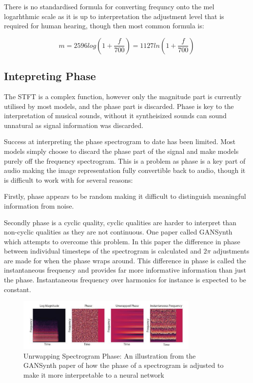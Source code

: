 There is no standardised formula for converting frequncy onto the mel logarhthmic scale as it is up to interpretation the adjustment level that is required for human hearing, though then most common formula is\cite{SpeechCommunication}:

\begin{equation}
    m = 2596 log(1 +  \frac{f}{700}) = 1127 ln (1 + \frac{f}{700})
\end{equation}

\subsection{Intepreting Phase}

The STFT is a complex function, however only the magnitude part is currently utilised by most models, and the phase part is discarded. Phase is key to the interpretation of musical sounds, without it syntheisized sounds can sound unnatural as signal information was discarded.

Success at interpreting the phase spectrogram to date has been limited. Most models simply choose to discard the phase part of the signal and make models purely off the frequency spectrogram. This is a problem as phase is a key part of audio making the image representation fully convertible back to audio, though it is difficult to work with for several reasons:

Firstly, phase appears to be random making it difficult to distinguish meaningful information from noise.

Secondly phase is a cyclic quality, cyclic qualities are harder to interpret than non-cyclic qualities as they are not continuous. One paper called GANSynth\cite{GANSynth} which attempts to overcome this problem. In this paper the difference in phase between individual timesteps of the spectrogram is calculated and $2\pi$ adjustments are made for when the phase wraps around. This difference in phase is called the instantaneous frequency and provides far more informative information than just the phase. Instantaneous frequency over harmonics for instance is expected to be constant.

\begin{figure}
    \centering
    \includegraphics[width=0.8\textwidth]{literature_review/PhaseAdjustment.png}
    \caption{Unrwapping Spectrogram Phase: An illustration from the GANSynth paper of how the phase of a spectrogram is adjusted to make it more interpretable to a neural network\cite{GANSynth}}
    \label{fig:phase_unwrapping}
\end{figure}

